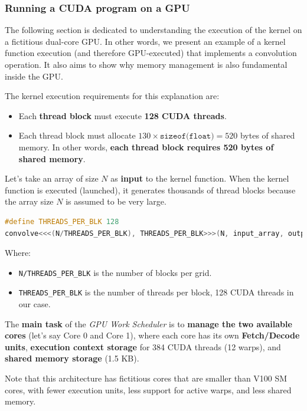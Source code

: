 \subsubsection{Running a CUDA program on a GPU}

The following section is dedicated to understanding the execution of the  kernel on a fictitious dual-core GPU. In other words, we present an example of a kernel function execution (and therefore GPU-executed) that implements a convolution operation. It also aims to show why memory management is also fundamental inside the GPU.

\highspace
The kernel execution requirements for this explanation are:
\begin{itemize}
    \item Each \textbf{thread block} must execute \textbf{128 CUDA threads}.
    \item Each thread block must allocate $130 \times \texttt{sizeof(float)} = 520$ bytes of shared memory. In other words, \textbf{each thread block requires 520 bytes of shared memory}.
\end{itemize}
Let's take an array of size $N$ as \textbf{input} to the kernel function. When the kernel function is executed (launched), it generates thousands of thread blocks because the array size $N$ is assumed to be very large.

\begin{lstlisting}[language=C++]
#define THREADS_PER_BLK 128
convolve<<<(N/THREADS_PER_BLK), THREADS_PER_BLK>>>(N, input_array, output_array);
\end{lstlisting}

\noindent
Where:
\begin{itemize}
    \item \texttt{N/THREADS\_PER\_BLK} is the number of blocks per grid.
    \item \texttt{THREADS\_PER\_BLK} is the number of threads per block, 128 CUDA threads in our case.
\end{itemize}
The \textbf{main task} of the \emph{GPU Work Scheduler} is to \textbf{manage the two available cores} (let's say Core 0 and Core 1), where each core has its own \textbf{Fetch/Decode units}, \textbf{execution context storage} for 384 CUDA threads (12 warps), and \textbf{shared memory storage} (1.5 KB).

\highspace
Note that this architecture has fictitious cores that are smaller than V100 SM cores, with fewer execution units, less support for active warps, and less shared memory.

